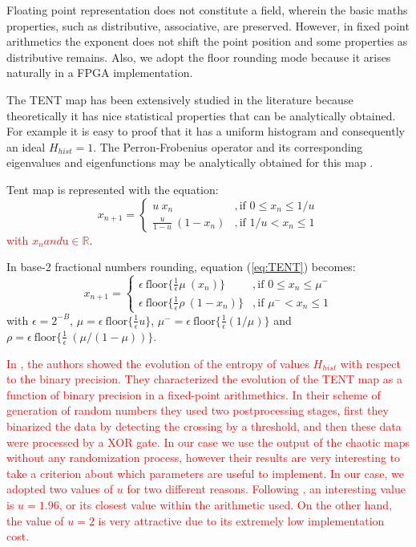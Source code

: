 Floating point representation does not constitute a field, wherein the basic maths properties, such as distributive, associative, are preserved.
However, in fixed point arithmetics the exponent does not shift the point position and some properties as distributive remains.
Also, we adopt the floor rounding mode because it arises naturally in a FPGA implementation.

The TENT map has been extensively studied in the literature because theoretically it has nice statistical properties that can be analytically obtained.
For example it is easy to proof that it has a uniform histogram and consequently an ideal $H_{hist}=1$.
The Perron-Frobenius operator and its corresponding eigenvalues and eigenfunctions may be analytically obtained for this map \cite{Lasota1994}.

Tent map is represented with the equation:
%
\begin{equation}\label{eq:TENT}
x_{n+1} =
\begin{cases}
	u~x_n &, \textrm{if } 0\leq x_n\leq 1/u\\
	\frac{u}{1-u}~(1-x_n) &, \textrm{if } 1/u< x_n\leq 1 
\end{cases}
\end{equation}
%
\textcolor{red}{with $x_n and $u$ \in \mathbb{R}$}.

In base-2 fractional numbers rounding, equation (\ref{eq:TENT}) becomes:
%
\begin{equation}\label{eq:TENTB2}
x_{n+1} = 
\begin{cases}
	\epsilon ~\text{floor} \{\frac{1}{\epsilon} \mu~(x_n)\} &, \textrm{if } 0\leq x_n\leq \mu^-\\
	\epsilon ~\text{floor} \{\frac{1}{\epsilon} \rho~(1-x_n)\} &, \textrm{if } \mu^-<x_n\leq 1 
\end{cases}	
\end{equation}
%
with $\epsilon=2^{-B}$, $\mu = \epsilon ~\text{floor}\{\frac{1}{\epsilon} u\}$, $\mu^- = \epsilon ~\text{floor}\{\frac{1}{\epsilon} (1/\mu)\}$ and $\rho = \epsilon ~\text{floor}\{\frac{1}{\epsilon} ~(\mu/(1-\mu)) \}$.

\textcolor{red}{
In \cite{DelaFraga2017}, the authors showed the evolution of the entropy of values $H_{hist}$ with respect to the binary precision.
They characterized the evolution of the TENT map as a function of binary precision in a fixed-point arithmethics.
In their scheme of generation of random numbers they used two postprocessing stages, first they binarized the data by detecting the crossing by a threshold, and then these data were processed by a XOR gate.
In our case we use the output of the chaotic maps without any randomization process, however their results are very interesting to take a criterion about which parameters are useful to implement.}
\textcolor{red}{
In our case, we adopted two values of $u$ for two different reasons.
Following \cite{DelaFraga2017}, an interesting value is $ u = 1.96 $, or its closest value within the arithmetic used.
On the other hand, the value of $u = 2$ is very attractive due to its extremely low implementation cost.}

